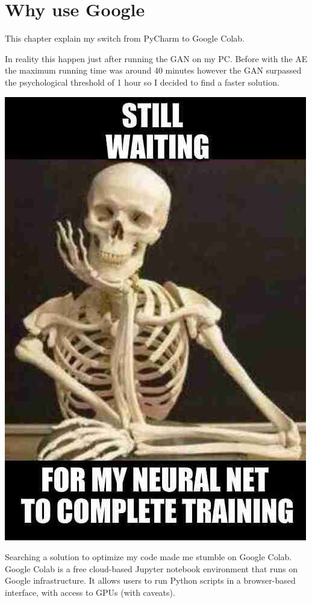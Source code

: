 \documentclass[
  letterpaper,
  DIV=11,
  numbers=noendperiod]{scrreprt}
\begin{document}
\hypertarget{why-use-google}{%
\chapter{Why use Google}\label{why-use-google}}

This chapter explain my switch from PyCharm to Google Colab.

In reality this happen just after running the GAN on my PC. Before with
the AE the maximum running time was around 40 minutes however the GAN
surpassed the psychological threshold of 1 hour so I decided to find a
faster solution.

\includegraphics{skeleton.jpg}

Searching a solution to optimize my code made me stumble on Google
Colab. Google Colab is a free cloud-based Jupyter notebook environment
that runs on Google infrastructure. It allows users to run Python
scripts in a browser-based interface, with access to GPUs (with
caveats).
\end{document}
